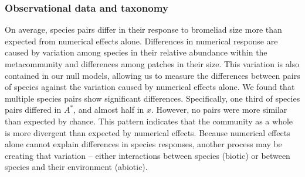 \subsubsection{Observational data and
taxonomy}\label{observational-data-and-taxonomy}

On average, species pairs differ in their response to bromeliad size
more than expected from numerical effects alone. Differences in
numerical response are caused by variation among species in their
relative abundance within the metacommunity and differences among
patches in their size. This variation is also contained in our null
models, allowing us to measure the differences between pairs of species
against the variation caused by numerical effects alone. We found that
multiple species pairs show significant differences. Specifically, one
third of species pairs differed in \(A^{*}\), and almost half in \(x\).
However, no pairs were more similar than expected by chance. This
pattern indicates that the community as a whole is more divergent than
expected by numerical effects. Because numerical effects alone cannot
explain differences in species responses, another process may be
creating that variation -- either interactions between species (biotic)
or between species and their environment (abiotic).

